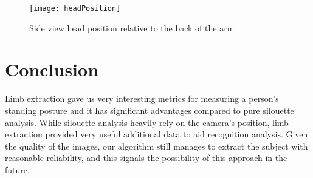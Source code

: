 \documentclass[10pt,journal,compsoc]{IEEEtran}
\begin{document}
\begin{figure}
\centering
\texttt{[image: headPosition]}
    \caption{Side view head position relative to the back of the arm}
\end{figure}


\section{Conclusion}
Limb extraction gave us very interesting metrics for measuring a person's standing posture and it has significant advantages compared to pure silouette analysis. While silouette analysis heavily rely on the camera's position, limb extraction provided very useful additional data to aid recognition analysis. Given the quality of the images, our algorithm still manages to extract the subject with reasonable reliability, and this signals the possibility of this approach in the future.





\end{document}

